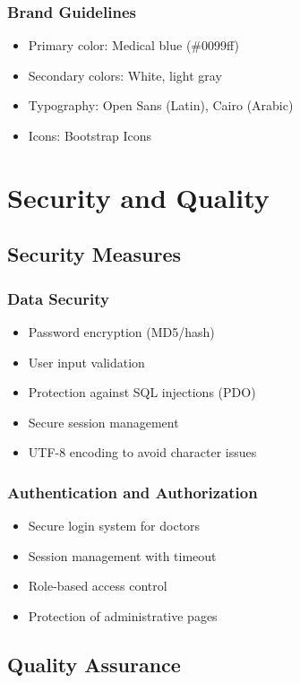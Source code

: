 \documentclass[12pt,a4paper]{report}
\begin{document}
\subsection{Brand Guidelines}
\begin{itemize}
    \item Primary color: Medical blue (\#0099ff)
    \item Secondary colors: White, light gray
    \item Typography: Open Sans (Latin), Cairo (Arabic)
    \item Icons: Bootstrap Icons
\end{itemize}

\chapter{Security and Quality}

\section{Security Measures}

\subsection{Data Security}
\begin{itemize}
    \item Password encryption (MD5/hash)
    \item User input validation
    \item Protection against SQL injections (PDO)
    \item Secure session management
    \item UTF-8 encoding to avoid character issues
\end{itemize}

\subsection{Authentication and Authorization}
\begin{itemize}
    \item Secure login system for doctors
    \item Session management with timeout
    \item Role-based access control
    \item Protection of administrative pages
\end{itemize}

\section{Quality Assurance}
\end{document}
